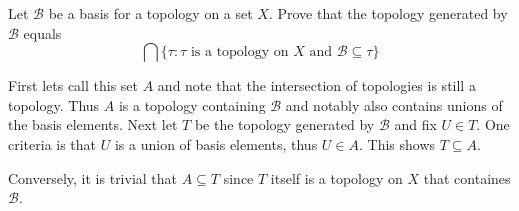 \documentclass[../main.tex]{subfiles}
\begin{document}
\begin{problem}[7]
    Let $\mathscr{B}$ be a basis for a topology on a set $X$.
    Prove that the topology generated by $\mathscr{B}$ equals
    \[ \bigcap \{ \tau : \tau \text{ is a topology on } X \text{ and } \mathscr{B} \subseteq \tau \} \]
\end{problem}
First lets call this set $A$ and note that the intersection of topologies is still a topology.
Thus $A$ is a topology containing $\mathscr{B}$ and notably also contains unions of the basis elements.
Next let $T$ be the topology generated by $\mathscr{B}$ and fix $U \in T$.
One criteria is that $U$ is a union of basis elements, thus $U \in A$.
This shows $T \subseteq A$.

Conversely, it is trivial that $A \subseteq T$ since $T$ itself is a topology on $X$ that containes $\mathscr{B}$.
\end{document}
